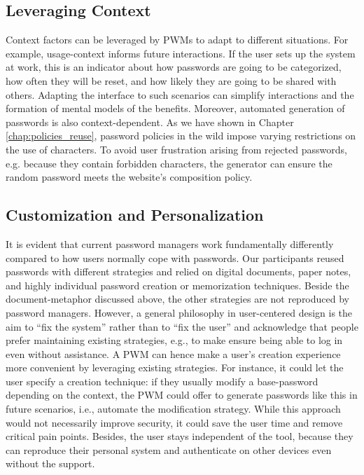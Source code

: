 \subsection{Leveraging Context}
Context factors can be leveraged by PWMs to adapt to different situations. For example, usage-context informs future interactions. If the user sets up the system at work, this is an indicator about how passwords are going to be categorized, how often they will be reset, and how likely they are going to be shared with others. Adapting the interface to such scenarios can simplify interactions and the formation of mental models of the benefits. Moreover, automated generation of passwords is also context-dependent. As we have shown in Chapter \ref{chap:policies_reuse}, password policies in the wild impose varying restrictions on the use of characters. To avoid user frustration arising from rejected passwords, e.g. because they contain forbidden characters, the generator can ensure the random password meets the website's composition policy. 


\subsection{Customization and Personalization}
It is evident that current password managers work fundamentally differently compared to how users normally cope with passwords. Our participants reused passwords with different strategies and relied on digital documents, paper notes, and highly individual password creation or memorization techniques. Beside the document-metaphor discussed above, the other strategies are not reproduced by password managers. However, a general philosophy in user-centered design is the aim to ``fix the system'' rather than to ``fix the user'' and acknowledge that people prefer maintaining existing strategies, e.g., to make ensure being able to log in even without assistance. A PWM can hence make a user's creation experience more convenient by leveraging existing strategies. For instance, it could let the user specify a creation technique: if they usually modify a base-password depending on the context, the PWM could offer to generate passwords like this in future scenarios, i.e., automate the modification strategy. While this approach would not necessarily improve security, it could save the user time and remove critical pain points. Besides, the user stays independent of the tool, because they can reproduce their personal system and authenticate on other devices even without the support. 

